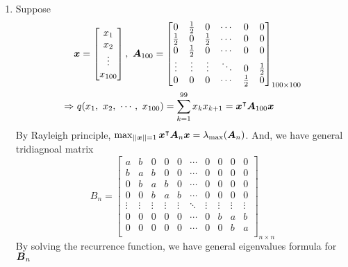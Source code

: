 \documentclass[a4paper,12pt]{article}
\begin{document}
\begin{enumerate}
    \item Suppose \begin{equation}
        \begin{aligned}
            & \boldsymbol{x} = \begin{bmatrix}
                x_1 \\
                x_2 \\
                \vdots \\
                x_{100}
            \end{bmatrix}, \ \boldsymbol{A}_{100} = \begin{bmatrix}
                0 & \frac{1}{2} & 0 & \cdots & 0 & 0 \\
                \frac{1}{2} & 0 & \frac{1}{2} & \cdots & 0 & 0 \\
                0 & \frac{1}{2} & 0 & \cdots & 0 & 0 \\
                \vdots & \vdots & \vdots & \ddots & 0 & \frac{1}{2} \\
                0 & 0 & 0 & \cdots & \frac{1}{2} & 0
            \end{bmatrix}_{100 \times 100} \\
            \Rightarrow & \ q(x_1, \ x_2, \ \cdots, \ x_{100}) = \sum_{k = 1}^{99}x_kx_{k + 1}  = \boldsymbol{x}^\intercal\boldsymbol{A}_{100}\boldsymbol{x}\\
        \end{aligned}
    \end{equation} By Rayleigh principle, $\max_{||\boldsymbol{x}|| = 1}\boldsymbol{x}^\intercal\boldsymbol{A}_n\boldsymbol{x} = \lambda_{\max}(\boldsymbol{A}_n)$. And, we have general tridiagnoal matrix \begin{equation}
        B_n = \begin{bmatrix}
            a & b & 0 & 0 & 0 & \cdots & 0 & 0 & 0 & 0 \\
            b & a & b & 0 & 0 & \cdots & 0 & 0 & 0 & 0 \\
            0 & b & a & b & 0 & \cdots & 0 & 0 & 0 & 0 \\
            0 & 0 & b & a & b & \cdots & 0 & 0 & 0 & 0 \\
            \vdots & \vdots & \vdots & \vdots & \vdots & \ddots & \vdots & \vdots & \vdots & \vdots \\
            0 & 0 & 0 & 0 & 0 & \cdots & 0 & b & a & b \\
            0 & 0 & 0 & 0 & 0 & \cdots & 0 & 0 & b & a \\
        \end{bmatrix}_{n \times n}
    \end{equation} By solving the recurrence function, we have general eigenvalues formula for $\boldsymbol{B}_n$ \begin{equation}

\end{equation}
\end{enumerate}
\end{document}
